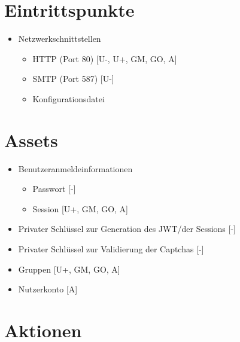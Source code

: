 \documentclass[12pt,DIV14,BCOR10mm,a4paper,parskip=half-,english,ngerman,bibliography=totocnumbered]{scrreprt}
\begin{document}
\chapter{Eintrittspunkte}

\begin{itemize}
  \item Netzwerkschnittstellen
  \begin{itemize}
    \item HTTP (Port 80)  [U-, U+, GM, GO, A]
    \item SMTP (Port 587) [U-]
    \item Konfigurationsdatei
  \end{itemize}
\end{itemize}

\chapter{Assets}

\begin{itemize}
  \item Benutzeranmeldeinformationen
  \begin{itemize}
    \item Passwort [-]
    \item Session [U+, GM, GO, A]
  \end{itemize}
  \item Privater Schlüssel zur Generation des JWT/der Sessions [-]
  \item Privater Schlüssel zur Validierung der Captchas [-]
  \item Gruppen [U+, GM, GO, A]
  \item Nutzerkonto [A]
\end{itemize}

\chapter{Aktionen}
\end{document}
